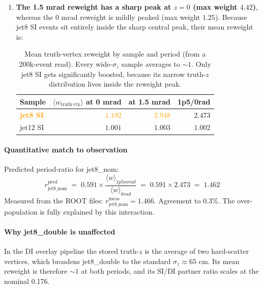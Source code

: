 \documentclass[11pt,a4paper]{article}
\newcommand{\warn}[1]{\textcolor{orange}{\textbf{#1}}}
\begin{document}
\begin{enumerate}
  \item \textbf{The 1.5 mrad reweight has a sharp peak at $z=0$ (max weight $4.42$)}, whereas the 0 mrad reweight is mildly peaked (max weight $1.25$). Because jet8 SI events sit entirely inside the sharp central peak, their mean reweight is:
  \begin{table}[H]
  \centering
  \begin{tabular}{lrrr}
  \toprule
  Sample     & $\langle w_{\mathrm{truth\,vtx}} \rangle$ at 0 mrad & at 1.5 mrad & 1p5/0rad  \\
  \midrule
  \warn{jet8 SI}      & \warn{$1.192$} & \warn{$2.948$} & $2.473$ \\
  jet12 SI            & $1.001$         & $1.003$         & $1.002$ \\
  \bottomrule
  \end{tabular}
  \caption{Mean truth-vertex reweight by sample and period (from a 200k-event read). Every wide-$\sigma_z$ sample averages to $\sim 1$. Only jet8 SI gets significantly boosted, because its narrow truth-$z$ distribution lives inside the reweight peak.}
  \label{tab:avg_reweight}
  \end{table}
\end{enumerate}

\paragraph{Quantitative match to observation} Predicted period-ratio for jet8\_nom:
\[
r_{\mathrm{jet8\_nom}}^{\mathrm{pred}} \;=\; 0.591 \times \frac{\langle w \rangle_{1p5mrad}}{\langle w \rangle_{0rad}} \;=\; 0.591 \times 2.473 \;=\; \boxed{1.462}
\]
Measured from the ROOT files: $r_{\mathrm{jet8\_nom}}^{\mathrm{meas}} = 1.466$. Agreement to 0.3\%. The over-population is fully explained by this interaction.

\paragraph{Why jet8\_double is unaffected} In the DI overlay pipeline the stored truth-$z$ is the average of two hard-scatter vertices, which broadens jet8\_double to the standard $\sigma_z \approx 65$ cm. Its mean reweight is therefore $\sim 1$ at both periods, and its SI/DI partner ratio scales at the nominal 0.176.
\end{document}
